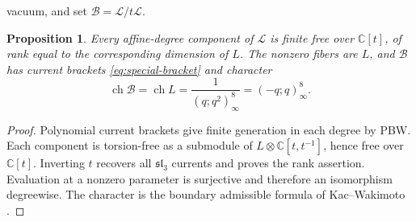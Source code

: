 \documentclass[11pt]{amsart}
\newtheorem{proposition}[theorem]{Proposition}
\theoremstyle{definition}
\theoremstyle{remark}
\newcommand{\C}{\mathbb C}
\DeclareMathOperator{\ch}{ch}
\newcommand{\slthree}{\mathfrak{sl}_3}
\begin{document}
vacuum, and set $\mathcal B=\mathscr L/t\mathscr L$.
\begin{proposition}\label{prop:flat}
Every affine-degree component of $\mathscr L$ is finite free over
$\C[t]$, of rank equal to the corresponding dimension of $L$.
The nonzero fibers are $L$, and $\mathcal B$ has current brackets
\eqref{eq:special-bracket} and character
\[
 \ch\mathcal B=\ch L=\frac1{(q;q^2)_\infty^8}=(-q;q)_\infty^8.
\]
\end{proposition}
\begin{proof}
Polynomial current brackets give finite generation in each degree by
PBW. Each component is torsion-free as a submodule of
$L\otimes\C[t,t^{-1}]$, hence free over $\C[t]$. Inverting $t$
recovers all $\slthree$ currents and proves the rank assertion.
Evaluation at a nonzero parameter is surjective and therefore an
isomorphism degreewise. The character is the boundary admissible
formula of Kac--Wakimoto \cite[Remark~1]{KW}.
\end{proof}

\color{black}
\end{document}
